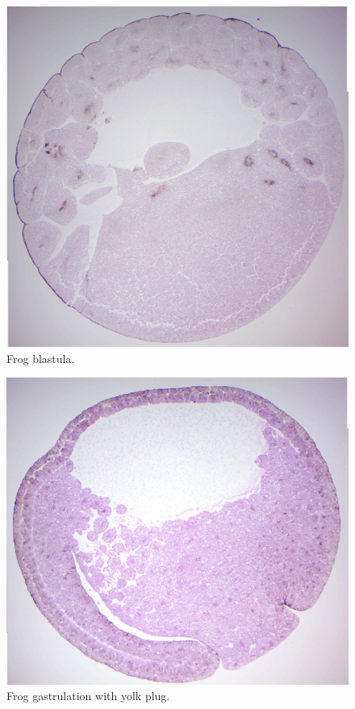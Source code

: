 \begin{figure}

{\centering \includegraphics[width=0.7\linewidth]{./figures/development/frog_blastula}

}

\caption{Frog blastula.}\label{fig:blastula}
\end{figure}

\begin{figure}

{\centering \includegraphics[width=0.7\linewidth]{./figures/development/frog_gastrula_yolk_plug}

}

\caption{Frog gastrulation with yolk plug.}\label{fig:plug}
\end{figure}

